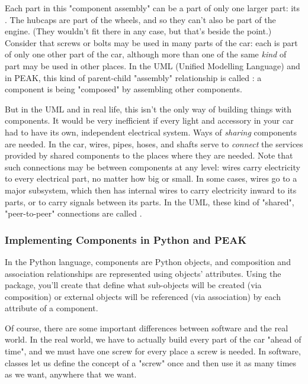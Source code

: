 Each part in this "component assembly" can be a part of only one larger part:
its .  The hubcaps are part of the wheels,
and so they can't also be part of the engine.  (They wouldn't fit there in 
any case, but that's beside the point.)  Consider that screws or bolts may
be used in many parts of the car: each is part of only one other part of
the car, although more than one of the same \emph{kind} of part may be used
in other places.  In the UML (Unified Modelling Language) and in PEAK, this
kind of parent-child "assembly" relationship  is called :
a component is being "composed" by assembling other components.

But in the UML and in real life, this isn't the only way of building things
with components.  It would be very inefficient if every light and accessory
in your car had to have its own, independent electrical system.  Ways of
\emph{sharing} components are needed.  In the car, wires, pipes, hoses, and
shafts serve to \emph{connect} the services provided by shared components to
the places where they are needed.  Note that such connections may be between
components at any level: wires carry electricity to every electrical part, no
matter how big or small.  In some cases, wires go to a major subsystem, which
then has internal wires to carry electricity inward to its parts, or to carry
signals between its parts.  In  the UML, these kind of "shared", "peer-to-peer"
connections are called .














\subsubsection{Implementing Components in Python and PEAK}

In the Python language, components are Python objects, and composition and
association relationships are represented using objects' attributes.  Using
the  package, you'll create 
that  define what sub-objects will be created (via composition) or external
objects  will be referenced (via association) by each attribute of a component.

Of course, there are some important differences between software and the real
world.  In the real world, we have to actually build every part of the car
"ahead of time", and we must have one screw for every place a screw is needed.
In software, classes let us define the concept of a "screw" once and then use
it as many times as we want, anywhere that we want.

